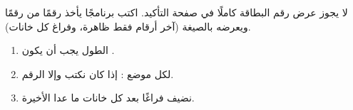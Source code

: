 \begin{statement}
لا يجوز عرض رقم البطاقة كاملًا في صفحة التأكيد. اكتب برنامجًا يأخذ رقمًا من  رقمًا ويعرضه بالصيغة  (آخر  أرقام فقط ظاهرة، وفراغ كل  خانات).
\end{statement}
\begin{stepsbox}\begin{enumerate}
\item الطول يجب أن يكون .
\item لكل موضع : إذا كان  نكتب \code{*} وإلا الرقم.
\item نضيف فراغًا بعد كل  خانات ما عدا الأخيرة.
\end{enumerate}\end{stepsbox}
